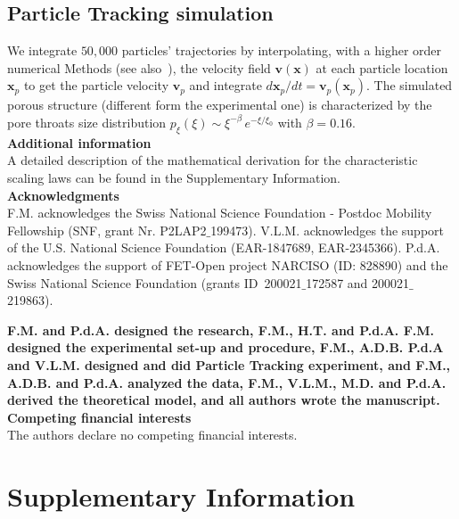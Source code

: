 \documentclass[singlecolumn,pre,notitlepage,preprintnumbers,floatfix,superscriptaddress]{revtex4-1}
\begin{document}
\subsection*{Particle Tracking simulation}
\noindent
We integrate $50,000$ particles' trajectories by interpolating, with a higher order numerical Methods (see also~\cite{deAnnaPRF2017}), the velocity field $\boldsymbol{v}(\boldsymbol{x})$ at each particle location $\boldsymbol{x}_p$ to get the particle velocity $\boldsymbol{v}_p$ and integrate $d \boldsymbol{x}_p /dt = \boldsymbol{v}_p(\boldsymbol{x}_p)$. The simulated porous structure (different form the experimental one) is characterized by the pore throats size distribution $p_\xi(\xi) \sim \xi^{-\beta} \, e^{-\xi/\xi_0}$ with $\beta = 0.16$.\\

\noindent
\textbf{Additional information}\\
A detailed description of the mathematical derivation for the characteristic scaling laws can be found in the Supplementary Information. \\

\noindent
\textbf{Acknowledgments}\\
F.M. acknowledges the Swiss National Science Foundation - Postdoc Mobility Fellowship (SNF, grant Nr. P2LAP2$\_$199473). V.L.M. acknowledges the support of the U.S. National Science Foundation (EAR-1847689, EAR-2345366). P.d.A. acknowledges the support of FET-Open project NARCISO (ID: 828890) and the Swiss National Science Foundation (grants ID~200021$\_$172587 and 200021$\_$219863).

\noindent
\textbf{F.M. and P.d.A. designed the research, F.M., H.T. and P.d.A. F.M. designed the experimental set-up and procedure, F.M., A.D.B. P.d.A and V.L.M. designed and did Particle Tracking experiment, and F.M., A.D.B. and P.d.A. analyzed the data, F.M., V.L.M., M.D. and P.d.A. derived the theoretical model, and all authors wrote the manuscript.} \\

\noindent
\textbf{Competing financial interests}\\
The authors declare no competing financial interests.\\

%
\clearpage
\section*{Supplementary Information}
\setcounter{figure}{0}
\renewcommand{\thefigure}{S\arabic{figure}}
\end{document}
